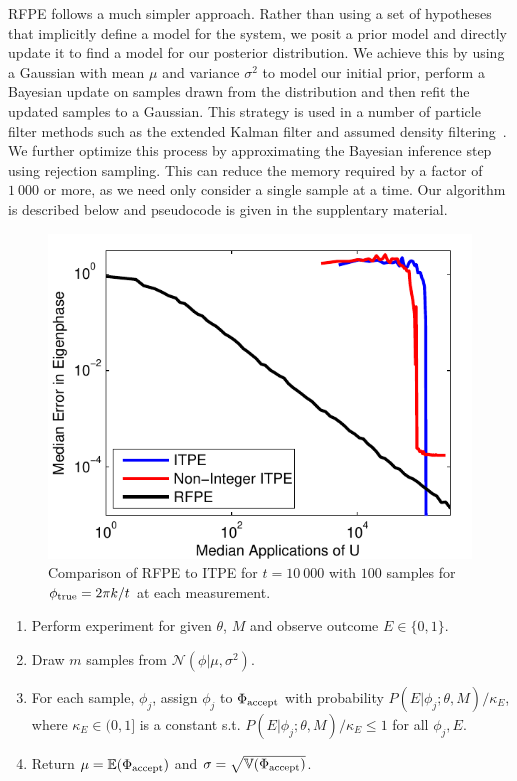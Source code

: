 \documentclass[aps,prl,amsmath,twocolumn,amssymb,superscriptaddress]{revtex4-1}
\newcommand{\app}[1]{the supplentary material}
\begin{document}
RFPE follows a much simpler approach. Rather than using a set of hypotheses that implicitly
define a model for the system, we posit a prior model and directly update it
to find a model for our posterior distribution.  We achieve this by using a
Gaussian with mean $\mu$ and variance $\sigma^2$ to model our initial prior, perform a Bayesian update on samples
drawn from the distribution and then refit the updated samples to a Gaussian.
This strategy is used in a number of particle filter methods such as the extended Kalman filter and assumed density
filtering~\cite{haykin2004kalman,opper1998bayesian}.  We further optimize
this process by approximating the Bayesian inference step using rejection
sampling.  This can reduce the memory required by a factor of $1~000$ or more,
as we need only consider a single sample at a time. Our algorithm is described
below and pseudocode is given in \app{pseudocode}.

\begin{figure}[t!]
    \begin{centering}
        \includegraphics[width=0.723\linewidth]{ITPEcmp.pdf}
    \end{centering}
    \caption{\label{fig:ITPEcmp}
     Comparison of RFPE to ITPE for $t=10~000$ with $100$ samples for $\phi_{\rm true} = 2\pi k/t$ at each measurement.  
    }
\end{figure}







\begin{enumerate}
\item Perform experiment for given $\theta$, $M$ and observe outcome $E\in \{0,1\}$.
\item Draw $m$ samples from $\mathcal{N}(\phi|\mu,\sigma^2)$.
\item For each sample, $\phi_j$, assign $\phi_j$ to $\Phi_{\rm accept}$ with probability $P(E|\phi_j;\theta,M)/\kappa_E$, where $\kappa_E\in (0,1]$ is a constant s.t. $P(E|\phi_j;\theta,M)/\kappa_E\le 1$ for all $\phi_j,E$.
\item Return $\mu = \mathbb{E}(\Phi_{\rm accept})$ and $\sigma =\sqrt{\mathbb{V}(\Phi_{\rm accept})}$.
\end{enumerate}
\end{document}
